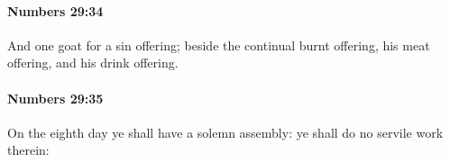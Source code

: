 		\paragraph{Numbers 29:34} %
			\label{NUMBERS-29-34}

			And one goat for a sin offering; beside the continual burnt offering, his meat offering, and his drink offering.


		\paragraph{Numbers 29:35} %
			\label{NUMBERS-29-35}

			On the eighth day ye shall have a solemn assembly: ye shall do no servile work therein:


